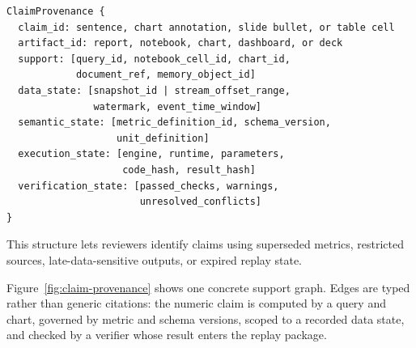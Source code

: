 \documentclass[10pt]{article}
\begin{document}
\begin{verbatim}
ClaimProvenance {
  claim_id: sentence, chart annotation, slide bullet, or table cell
  artifact_id: report, notebook, chart, dashboard, or deck
  support: [query_id, notebook_cell_id, chart_id,
            document_ref, memory_object_id]
  data_state: [snapshot_id | stream_offset_range,
               watermark, event_time_window]
  semantic_state: [metric_definition_id, schema_version,
                   unit_definition]
  execution_state: [engine, runtime, parameters,
                    code_hash, result_hash]
  verification_state: [passed_checks, warnings,
                       unresolved_conflicts]
}
\end{verbatim}

This structure lets reviewers identify claims using superseded metrics, restricted sources, late-data-sensitive outputs, or expired replay state.

Figure~\ref{fig:claim-provenance} shows one concrete support graph. Edges are typed rather than generic citations: the numeric claim is computed by a query and chart, governed by metric and schema versions, scoped to a recorded data state, and checked by a verifier whose result enters the replay package.
\end{document}
